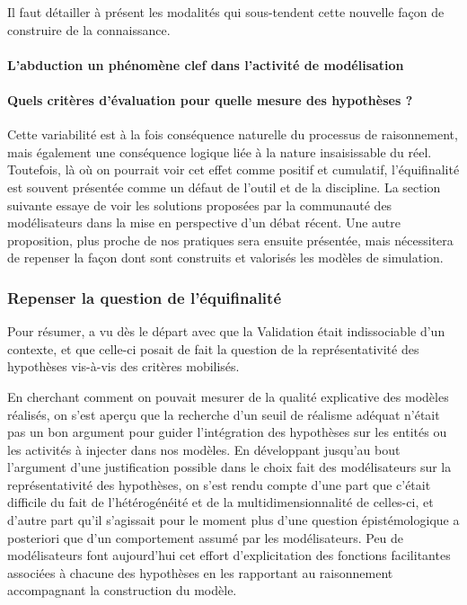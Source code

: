 Il faut détailler à présent les modalités qui sous-tendent cette nouvelle façon de construire de la connaissance.

\paragraph{L'abduction un phénomène clef dans l'activité de modélisation}
\label{p:abduction}



\paragraph{Quels critères d'évaluation pour quelle mesure des hypothèses ?}
\label{p:critere_evaluation}



Cette variabilité est à la fois conséquence naturelle du processus de raisonnement, mais également une conséquence logique liée à la nature insaisissable du réel. Toutefois, là où on pourrait voir cet effet comme positif et cumulatif, l'équifinalité est souvent présentée comme un défaut de l'outil et de la discipline. La section suivante essaye de voir les solutions proposées par la communauté des modélisateurs dans la mise en perspective d'un débat récent. Une autre proposition, plus proche de nos pratiques sera ensuite présentée, mais nécessitera de repenser la façon dont sont construits et valorisés les modèles de simulation. %

\subsubsection{Repenser la question de l'équifinalité}
\label{sssec:equifinalite}

Pour résumer, a vu dès le départ avec \textcite{Hermann1967} que la Validation était indissociable d'un contexte, et que celle-ci posait de fait la question de la représentativité des hypothèses vis-à-vis des critères mobilisés.

En cherchant comment on pouvait mesurer de la qualité explicative des modèles réalisés, on s'est aperçu que la recherche d'un seuil de réalisme adéquat n'était pas un bon argument pour guider l'intégration des hypothèses sur les entités ou les activités à injecter dans nos modèles. En développant jusqu'au bout l'argument d'une justification possible dans le choix fait des modélisateurs sur la représentativité des hypothèses, on s'est rendu compte d'une part que c'était difficile du fait de l'hétérogénéité et de la multidimensionnalité de celles-ci, et d'autre part qu'il s'agissait pour le moment plus d'une question épistémologique a posteriori que d'un comportement assumé par les modélisateurs. Peu de modélisateurs font aujourd'hui cet effort d'explicitation des fonctions facilitantes associées à chacune des hypothèses en les rapportant au raisonnement accompagnant la construction du modèle.

